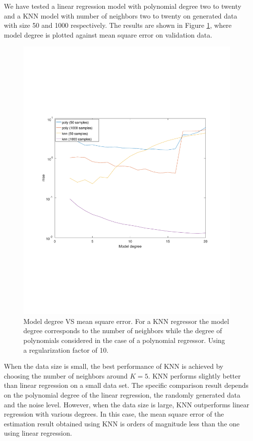 \documentclass[]{article}
\begin{document}
We have tested a linear regression model with polynomial degree two to twenty and a KNN model with number of neighbors two to twenty on generated data with size 50 and 1000 respectively. The results are shown in Figure \ref{fig:KNNvsPoly-degree}, where model degree is plotted against mean square error on validation data. 
\begin{figure}[ht]
	\centering
	\includegraphics[trim= 10cm 5cm 10cm 5cm, scale=0.4]{proj1-3_3}
	\caption{Model degree VS mean square error. For a KNN regressor the model degree corresponds to the number of neighbors while the degree of polynomials considered in the case of a polynomial regressor. Using a regularization factor of 10.}
	\label{fig:KNNvsPoly-degree}
\end{figure}
When the data size is small, the best performance of KNN is achieved by choosing the number of neighbors around $K=5$. KNN performs slightly better than linear regression on a small data set. The specific comparison result depends on the polynomial degree of the linear regression, the randomly generated data and the noise level. However, when the data size is large, KNN outperforms linear regression with various degrees. In this case, the mean square error of the estimation result obtained using KNN is orders of magnitude less than the one using linear regression.
\end{document}
